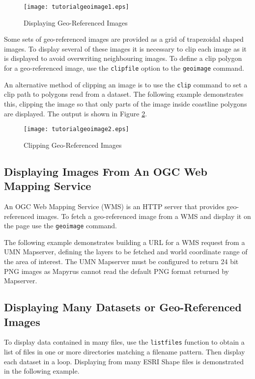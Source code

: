 \begin{figure}[htb]
\texttt{[image: tutorialgeoimage1.eps]}
\caption{Displaying Geo-Referenced Images}
\label{tutorialgeoimage1}
\end{figure}

Some sets of geo-referenced images are provided as a grid
of trapezoidal shaped images.
To display several of these images it is necessary to clip
each image as it is displayed to avoid overwriting neighbouring
images.  To define a clip polygon for a geo-referenced image, use
the \texttt{clipfile} option to the \texttt{geoimage} command.

An alternative method of clipping an image is to use the
\texttt{clip} command to set a clip path to polygons read from a dataset.
The following example demonstrates this, clipping the image so
that only parts of the image inside coastline polygons are displayed.
The output is shown in Figure \ref{tutorialgeoimage2}.



\begin{figure}[htb]
\texttt{[image: tutorialgeoimage2.eps]}
\caption{Clipping Geo-Referenced Images}
\label{tutorialgeoimage2}
\end{figure}

\subsection{Displaying Images From An OGC Web Mapping Service}

An OGC Web Mapping Service (WMS) is an HTTP server that provides
geo-referenced images.
To fetch a geo-referenced image from a WMS and display it
on the page use the \texttt{geoimage} command.

The following example demonstrates building a URL for a WMS request
from a UMN Mapserver,
defining the layers to be fetched and world coordinate range
of the area of interest.
The UMN Mapserver must be configured to return 24 bit PNG images
as Mapyrus cannot read the default PNG format returned by Mapserver.



\subsection{Displaying Many Datasets or Geo-Referenced Images}

To display data contained in many files, use the \texttt{listfiles}
function to obtain a list of files in one or more directories matching
a filename pattern.  Then display each dataset in a loop.
Displaying from many ESRI Shape files is demonstrated in the following
example.

